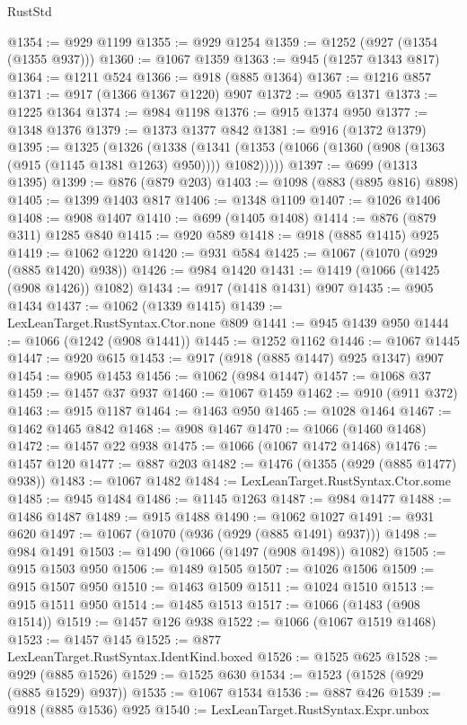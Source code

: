 \begin{lexlean}{RustStd}
\begin{coremodule}
@1354 := @929 @1199
@1355 := @929 @1254
@1359 := @1252 (@927 (@1354 (@1355 @937)))
@1360 := @1067 @1359
@1363 := @945 (@1257 @1343 @817)
@1364 := @1211 @524
@1366 := @918 (@885 @1364)
@1367 := @1216 @857
@1371 := @917 (@1366 @1367 @1220) @907
@1372 := @905 @1371
@1373 := @1225 @1364
@1374 := @984 @1198
@1376 := @915 @1374 @950
@1377 := @1348 @1376
@1379 := @1373 @1377 @842
@1381 := @916 (@1372 @1379)
@1395 := @1325
    (@1326
      (@1338 (@1341 (@1353 (@1066 (@1360 (@908 (@1363 (@915 (@1145 @1381 @1263) @950)))) @1082)))))
@1397 := @699 (@1313 @1395)
@1399 := @876 (@879 @203)
@1403 := @1098 (@883 (@895 @816) @898)
@1405 := @1399 @1403 @817
@1406 := @1348 @1109
@1407 := @1026 @1406
@1408 := @908 @1407
@1410 := @699 (@1405 @1408)
@1414 := @876 (@879 @311) @1285 @840
@1415 := @920 @589
@1418 := @918 (@885 @1415) @925
@1419 := @1062 @1220
@1420 := @931 @584
@1425 := @1067 (@1070 (@929 (@885 @1420) @938))
@1426 := @984 @1420
@1431 := @1419 (@1066 (@1425 (@908 @1426)) @1082)
@1434 := @917 (@1418 @1431) @907
@1435 := @905 @1434
@1437 := @1062 (@1339 @1415)
@1439 := LexLeanTarget.RustSyntax.Ctor.none @809
@1441 := @945 @1439 @950
@1444 := @1066 (@1242 (@908 @1441))
@1445 := @1252 @1162
@1446 := @1067 @1445
@1447 := @920 @615
@1453 := @917 (@918 (@885 @1447) @925 @1347) @907
@1454 := @905 @1453
@1456 := @1062 (@984 @1447)
@1457 := @1068 @37
@1459 := @1457 @37 @937
@1460 := @1067 @1459
@1462 := @910 (@911 @372)
@1463 := @915 @1187
@1464 := @1463 @950
@1465 := @1028 @1464
@1467 := @1462 @1465 @842
@1468 := @908 @1467
@1470 := @1066 (@1460 @1468)
@1472 := @1457 @22 @938
@1475 := @1066 (@1067 @1472 @1468)
@1476 := @1457 @120
@1477 := @887 @203
@1482 := @1476 (@1355 (@929 (@885 @1477) @938))
@1483 := @1067 @1482
@1484 := LexLeanTarget.RustSyntax.Ctor.some
@1485 := @945 @1484
@1486 := @1145 @1263
@1487 := @984 @1477
@1488 := @1486 @1487
@1489 := @915 @1488
@1490 := @1062 @1027
@1491 := @931 @620
@1497 := @1067 (@1070 (@936 (@929 (@885 @1491) @937)))
@1498 := @984 @1491
@1503 := @1490 (@1066 (@1497 (@908 @1498)) @1082)
@1505 := @915 @1503 @950
@1506 := @1489 @1505
@1507 := @1026 @1506
@1509 := @915 @1507 @950
@1510 := @1463 @1509
@1511 := @1024 @1510
@1513 := @915 @1511 @950
@1514 := @1485 @1513
@1517 := @1066 (@1483 (@908 @1514))
@1519 := @1457 @126 @938
@1522 := @1066 (@1067 @1519 @1468)
@1523 := @1457 @145
@1525 := @877 LexLeanTarget.RustSyntax.IdentKind.boxed
@1526 := @1525 @625
@1528 := @929 (@885 @1526)
@1529 := @1525 @630
@1534 := @1523 (@1528 (@929 (@885 @1529) @937))
@1535 := @1067 @1534
@1536 := @887 @426
@1539 := @918 (@885 @1536) @925
@1540 := LexLeanTarget.RustSyntax.Expr.unbox

\end{coremodule}
\end{lexlean}
